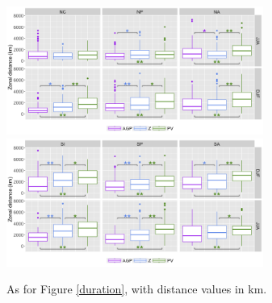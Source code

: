 \documentclass[smallextended]{svjour3}       %
\numberwithin{equation}{section}
\begin{document}
\begin{figure}
    \centering
    \includegraphics[width=0.75\textwidth]{fig_distance_NH.png}
    \includegraphics[width=0.75\textwidth]{fig_distance_SH.png}
    \caption{As for Figure \ref{duration}, with distance values in km.}
    \label{dist}
\end{figure}


\end{document}
